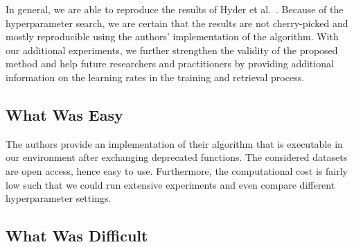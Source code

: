 
In general, we are able to reproduce the results of Hyder et al.~\cite{hyder2020solving}. Because of the hyperparameter search, we are certain that the results are not cherry-picked and mostly reproducible using the authors' implementation of the algorithm. With our additional experiments, we further strengthen the validity of the proposed method and help future researchers and practitioners by providing additional information on the learning rates in the training and retrieval process.


\subsection*{What Was Easy}


The authors provide an implementation of their
algorithm that is executable in our environment after exchanging
deprecated functions. The considered datasets are open access, hence
easy to use. Furthermore, the computational cost is fairly low such
that we could run extensive experiments and even compare different hyperparameter settings.

\subsection*{What Was Difficult}


